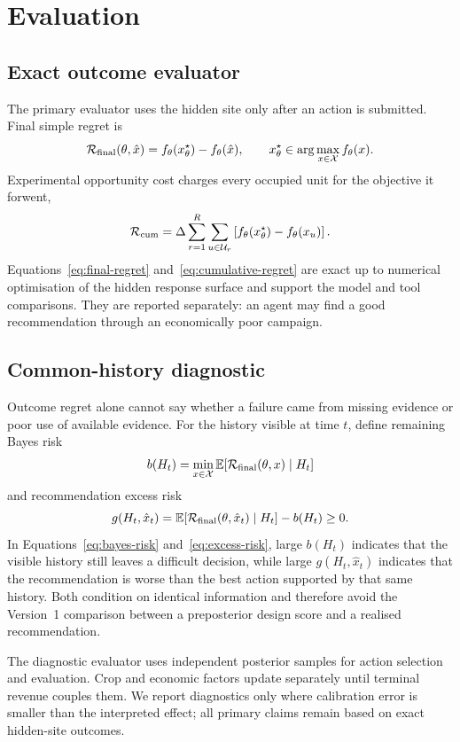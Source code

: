 \section{Evaluation}
\label{sec:evaluation}

\subsection{Exact outcome evaluator}
The primary evaluator uses the hidden site only after an action is submitted. Final simple
regret is
\begin{equation}
 \mathcal{R}_{\mathrm{final}}(\theta,\hat x)=f_\theta(x^\star_\theta)-f_\theta(\hat x),
 \qquad x^\star_\theta\in\arg\max_{x\in\mathcal X}f_\theta(x).
 \label{eq:final-regret}
\end{equation}
Experimental opportunity cost charges every occupied unit for the objective it forwent,
\begin{equation}
 \mathcal{R}_{\mathrm{cum}}=\Delta\sum_{r=1}^R\sum_{u\in\mathcal U_r}
 \left[f_\theta(x^\star_\theta)-f_\theta(x_u)\right].
 \label{eq:cumulative-regret}
\end{equation}
Equations~\ref{eq:final-regret} and~\ref{eq:cumulative-regret} are exact up to numerical optimisation of the hidden response surface and support the model and tool comparisons. They are reported separately: an agent may find a
good recommendation through an economically poor campaign.

\subsection{Common-history diagnostic}
Outcome regret alone cannot say whether a failure came from missing evidence or poor use of
available evidence. For the history visible at time $t$, define remaining Bayes risk
\begin{equation}
 b(H_t)=\min_{x\in\mathcal X}\mathbb E[\mathcal{R}_{\mathrm{final}}(\theta,x)\mid H_t]
 \label{eq:bayes-risk}
\end{equation}
and recommendation excess risk
\begin{equation}
 g(H_t,\hat x_t)=
 \mathbb E[\mathcal{R}_{\mathrm{final}}(\theta,\hat x_t)\mid H_t]-b(H_t)\geq0.
 \label{eq:excess-risk}
\end{equation}
In Equations~\ref{eq:bayes-risk} and~\ref{eq:excess-risk}, large $b(H_t)$ indicates that the visible history still leaves a difficult decision, while large $g(H_t,\hat x_t)$ indicates that the recommendation is worse than the best action supported by that same history. Both condition on identical information and therefore avoid the
Version~1 comparison between a preposterior design score and a realised recommendation.

The diagnostic evaluator uses independent posterior samples for action selection and
evaluation. Crop and economic factors update separately until terminal revenue couples
them. We report diagnostics only where calibration error is smaller than the interpreted
effect; all primary claims remain based on exact hidden-site outcomes.
